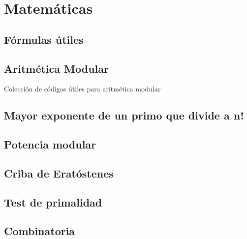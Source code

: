 \documentclass[10pt,letterpaper,twocolumn,twosided]{article}
\newcommand{\codigofuente}[1]{

\dotfill
}
\begin{document}
\codigofuente{src/dp/josephus.cpp}

\section{Matemáticas}

\subsection{Fórmulas útiles}


\subsection{Aritmética Modular}

Colección de códigos útiles para aritmética modular\\

\codigofuente{src/mate/euclidean.cpp}

\subsection{Mayor exponente de un primo que divide a n!}

\codigofuente{src/mate/pow_div.cpp}

\subsection{Potencia modular}

\codigofuente{src/mate/mod_pow.cpp}

\subsection{Criba de Eratóstenes}

\codigofuente{src/mate/sieve.cpp}

\subsection{Test de primalidad}

\codigofuente{src/mate/rabin.cpp}


\subsection{Combinatoria}
\end{document}

